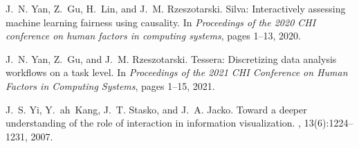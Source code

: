 \documentclass[11pt]{article}
\begin{document}
\begin{thebibliography}{10}
\begin{small}
J.~N. Yan, Z.~Gu, H.~Lin, and J.~M. Rzeszotarski.
\newblock Silva: Interactively assessing machine learning fairness using
  causality.
\newblock In {\em Proceedings of the 2020 CHI conference on human factors in
  computing systems}, pages 1--13, 2020.

J.~N. Yan, Z.~Gu, and J.~M. Rzeszotarski.
\newblock Tessera: Discretizing data analysis workflows on a task level.
\newblock In {\em Proceedings of the 2021 CHI Conference on Human Factors in
  Computing Systems}, pages 1--15, 2021.

J.~S. Yi, Y.~ah~Kang, J.~T. Stasko, and J.~A. Jacko.
\newblock Toward a deeper understanding of the role of interaction in
  information visualization.
, 13(6):1224--1231, 2007.

\end{small}
\end{thebibliography}
\end{document}
